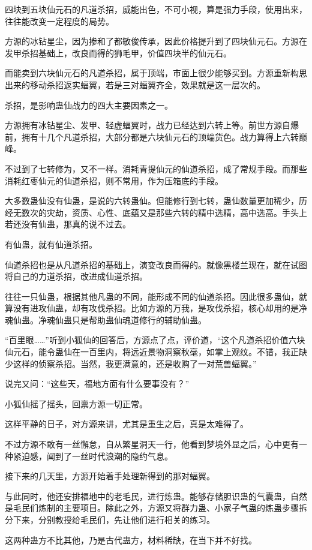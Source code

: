 \begin{this_body}
四块到五块仙元石的凡道杀招，威能出色，不可小视，算是强力手段，使用出来，往往能改变一定程度的局势。

方源的冰钻星尘，因为掺和了都敏俊传承，因此价格提升到了四块仙元石。方源在发甲杀招基础上，改良而得的狮毛甲，价值四块半的仙元石。

而能卖到六块仙元石的凡道杀招，属于顶端，市面上很少能够买到。方源重新构思出来的移动杀招返实蝠翼，若是三对蝠翼齐全，效果就是这一层次的。

杀招，是影响蛊仙战力的四大主要因素之一。

方源拥有冰钻星尘、发甲、轻虚蝠翼时，战力已经达到六转上等。前世方源自爆前，拥有十几个凡道杀招，大部分都是六块仙元石的顶端货色。战力算得上六转巅峰。

不过到了七转修为，又不一样。消耗青提仙元的仙道杀招，成了常规手段。而那些消耗红枣仙元的仙道杀招，则不常用，作为压箱底的手段。

大多数蛊仙没有仙蛊，是说的六转蛊仙。但能修行到七转，蛊仙数量更加稀少，历经无数次的灾劫，资质、心性、底蕴又是那些六转的精中选精，高中选高。手头上若还没有仙蛊，那真的说不过去。

有仙蛊，就有仙道杀招。

仙道杀招也是从凡道杀招的基础上，演变改良而得的。就像黑楼兰现在，就在试图将自己的力道杀招，改进成仙道杀招。

往往一只仙蛊，根据其他凡蛊的不同，能形成不同的仙道杀招。因此很多蛊仙，就算没有进攻仙蛊，却有攻伐杀招。比如方源的万我，是攻伐杀招，核心却用的是净魂仙蛊。净魂仙蛊只是帮助蛊仙魂道修行的辅助仙蛊。

“百里眼……”听到小狐仙的回答后，方源点了点，评价道，“这个凡道杀招价值六块仙元石，能令蛊仙在一百里内，将远近景物洞察秋毫，如掌上观纹。不错，我正缺少这样的侦察杀招。当然，我更满意的，还是收购了一对荒兽蝠翼。”

说完又问：“这些天，福地方面有什么要事没有？”

小狐仙摇了摇头，回禀方源一切正常。

这样平静的日子，对方源来讲，尤其是重生之后，真是太难得了。

不过方源不敢有一丝懈怠，自从繁星洞天一行，他看到梦境外显之后，心中更有一种紧迫感，闻到了一丝时代浪潮的隐约气息。

接下来的几天里，方源开始着手处理新得到的那对蝠翼。

与此同时，他还安排福地中的老毛民，进行炼蛊。能够存储胆识蛊的气囊蛊，自然是毛民们炼制的主要项目。除此之外，方源又将群力蛊、小家子气蛊的炼蛊步骤拆分下来，分别教授给毛民们，先让他们进行相关的练习。

这两种蛊方不比其他，乃是古代蛊方，材料稀缺，在当下并不好找。


\end{this_body}
